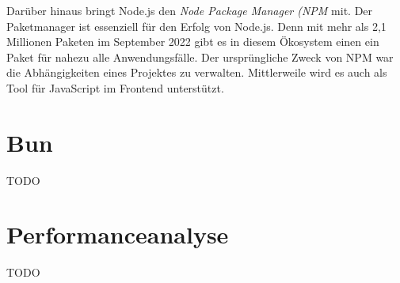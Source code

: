 \noindent
Darüber hinaus bringt Node.js den \textit{Node Package Manager (NPM} mit. Der Paketmanager ist essenziell für den Erfolg von Node.js. Denn mit mehr als 2,1 Millionen Paketen im September 2022 gibt es in diesem Ökosystem einen ein Paket für nahezu alle Anwendungsfälle. Der ursprüngliche Zweck von NPM war die Abhängigkeiten eines Projektes zu verwalten. Mittlerweile wird es auch als Tool für JavaScript im Frontend unterstützt. \cite{OpenJSFoundation.2022}  \\



\section{Bun} \label{sec:Node}
TODO\\

\section{Performanceanalyse} \label{sec:Performanceanalyse}
TODO\\
